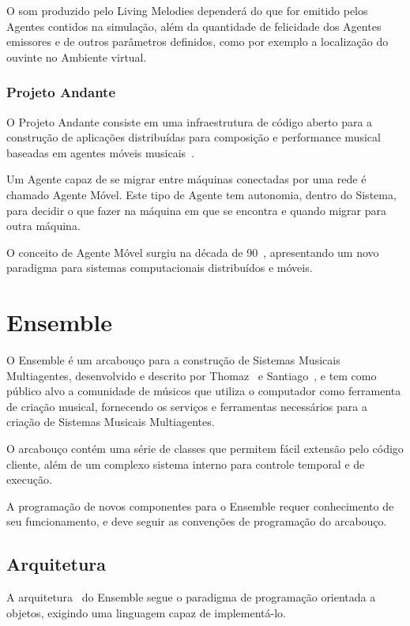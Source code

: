 \documentclass[a4paper, 11pt, twoside]{article}
\begin{document}
\begin{multicols}{2}
O som produzido pelo Living Melodies dependerá do que for emitido pelos 
Agentes contidos na simulação, além da quantidade de felicidade dos Agentes 
emissores e de outros parâmetros definidos, como por exemplo
a localização do ouvinte no Ambiente virtual.

\subsubsection{Projeto Andante}

O Projeto Andante consiste em uma infraestrutura de código aberto para a 
construção de aplicações distribuídas para composição e performance musical 
baseadas em agentes móveis musicais~\cite{ueda2003andante}.

Um Agente capaz de se migrar entre máquinas conectadas por uma rede é chamado 
Agente Móvel. Este tipo de Agente tem autonomia, dentro do Sistema, para 
decidir o que fazer na máquina em que se encontra e quando migrar para outra 
máquina.

O conceito de Agente Móvel surgiu na década de 90~\cite{johansen1995operating},
apresentando um novo paradigma para sistemas computacionais distribuídos e 
móveis.

\section{Ensemble}

O Ensemble é um arcabouço para a construção de Sistemas Musicais Multiagentes, 
desenvolvido e descrito por Thomaz~\cite{leandro11} e 
Santiago~\cite{santiago12}, e tem como público alvo a comunidade de músicos que
utiliza o computador como ferramenta de criação musical, fornecendo os serviços
e ferramentas necessários para a criação de Sistemas Musicais Multiagentes. 

O arcabouço contém uma série de classes que permitem fácil extensão pelo
código cliente, além de um complexo sistema interno para
controle temporal e de execução.

A programação de novos componentes para o Ensemble requer conhecimento de seu 
funcionamento, e deve seguir as convenções de programação do arcabouço. 

\subsection{Arquitetura}

A arquitetura~\cite{leandro11} do Ensemble segue o paradigma de programação 
orientada a objetos, exigindo uma linguagem capaz de implementá-lo.


\end{multicols}
\end{document}
